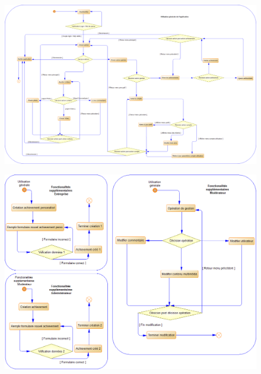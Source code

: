 \documentclass{life-fr}
\begin{document}
\begin{figure}[H]
  \begin{center}
    \includegraphics[width=17cm]{img/processus_principaux_2.png}
  \end{center}
\end{figure}

\newpage

\begin{figure}[H]
  \begin{center}
    \includegraphics[width=17cm]{img/processus_principaux_1.png}
  \end{center}
\end{figure}

\vskip 3cm
\end{document}
